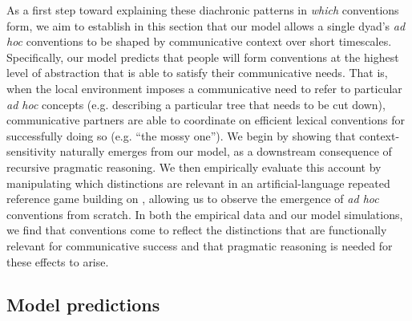 As a first step toward explaining these diachronic patterns in \emph{which} conventions form, we aim to establish in this section that our model allows a single dyad's \emph{ad hoc} conventions to be shaped by communicative context over short timescales.
Specifically, our model predicts that people will form conventions at the highest level of abstraction that is able to satisfy their communicative needs.
That is, when the local environment imposes a communicative need to refer to particular \emph{ad hoc} concepts (e.g. describing a particular tree that needs to be cut down), communicative partners are able to coordinate on efficient lexical conventions for successfully doing so (e.g. ``the mossy one'').
We begin by showing that context-sensitivity naturally emerges from our model, as a downstream consequence of recursive pragmatic reasoning.
We then empirically evaluate this account by manipulating which distinctions are relevant in an artificial-language repeated reference game building on , allowing us to observe the emergence of \emph{ad hoc} conventions from scratch.
In both the empirical data and our model simulations, we find that conventions come to reflect the distinctions that are functionally relevant for communicative success and that pragmatic reasoning is needed for these effects to arise. 


\subsection{Model predictions}

